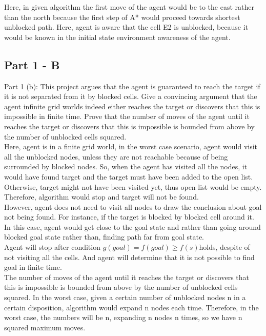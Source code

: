 \documentclass[preprint,12pt,3p]{elsarticle}
\begin{document}
Here, in given algorithm the first move of the agent would be to the east rather than the north because the first step of A* would proceed towards shortest unblocked path. Here, agent is aware that the cell E2 is unblocked, because it would be known in the initial state environment awareness of the agent.


\subsection{Part 1 - B}
\label{subsec1}

Part 1 (b): This project argues that the agent is guaranteed to reach the target if it is not separated from it by blocked cells. Give a convincing argument that the agent infinite grid worlds indeed either reaches the target or discovers that this is impossible in finite time. Prove that the number of moves of the agent until it reaches the target or discovers that this is impossible is bounded from above by the number of unblocked cells squared.\\

Here, agent is in a finite grid world, in the worst case scenario, agent would visit all the unblocked nodes, unless they are not reachable because of being surrounded by blocked nodes. So, when the agent has visited all the nodes, it would have found target and the target must have been added to the open list. Otherwise, target might not have been visited yet, thus open list would be empty. Therefore, algorithm would stop and target will not be found.\\

However, agent does not need to visit all nodes to draw the conclusion about goal not being found. For instance, if the target is blocked by blocked cell around it. In this case, agent would get close to the goal state and rather than going around blocked goal state rather than, finding path far from goal state.\\

Agent will stop after condition $g(goal) = f(goal) \geq f(s) $holds, despite of not visiting all the cells. And agent will determine that it is not possible to find goal in finite time.\\

The number of moves of the agent until it reaches the target or discovers that this is impossible is bounded from above by the number of unblocked cells squared. In the worst case, given a certain number of unblocked nodes n in a certain disposition, algorithm would expand n nodes each time. Therefore, in the worst case, the numbers will be n, expanding n nodes n times, so we have n squared maximum moves.
\end{document}
